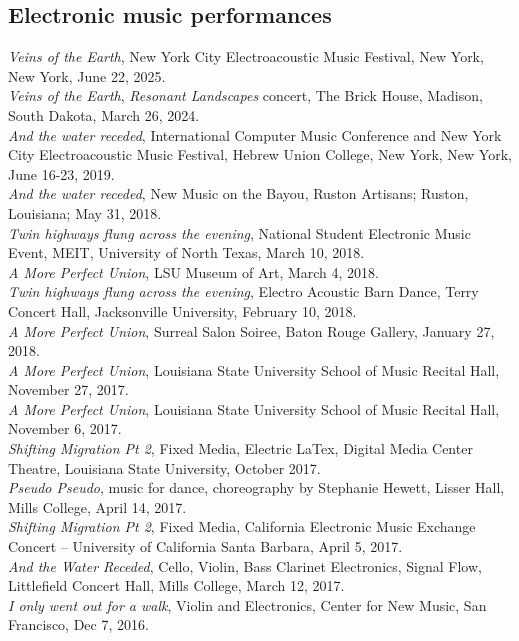 \documentclass[12pt, a4paper]{article}
\newcommand{\years}[1]{\leavevmode\marginnote{\scriptsize #1}\ignorespaces}%
\begin{document}
\subsection*{Electronic music performances}
\years{2025} \textit{Veins of the Earth}, New York City Electroacoustic Music Festival, New York, New York, June 22, 2025. \\
\years{2024} \textit{Veins of the Earth}, \textit{Resonant Landscapes} concert, The Brick House, Madison, South Dakota, March 26, 2024. \\
\years{2019} \textit{And the water receded}, International Computer Music Conference and New York City Electroacoustic Music Festival, Hebrew Union College, New York, New York, June 16-23, 2019. \\
\years{2018} \textit{And the water receded}, New Music on the Bayou, Ruston Artisans; Ruston, Louisiana; May 31, 2018. \\  
\textit{Twin highways flung across the evening}, National Student Electronic Music Event, MEIT, University of North Texas, March 10, 2018. \\
\textit{A More Perfect Union}, LSU Museum of Art, March 4, 2018. \\
\textit{Twin highways flung across the evening}, Electro Acoustic Barn Dance, Terry Concert Hall, Jacksonville University, February 10, 2018. \\
\textit{A More Perfect Union}, Surreal Salon Soiree, Baton Rouge Gallery, January 27, 2018.\\
\years{2017}\textit{A  More Perfect Union}, Louisiana State University School of Music Recital Hall, November 27, 2017. \\
\textit{A More Perfect Union}, Louisiana State University School of Music Recital Hall, November 6, 2017.\\
\textit{Shifting Migration Pt 2}, Fixed Media, Electric LaTex, Digital Media Center Theatre, Louisiana State University, October 2017.\\
\textit{Pseudo Pseudo}, music for dance, choreography by Stephanie Hewett, Lisser Hall, Mills College, April 14, 2017. \\
\textit{Shifting Migration Pt 2}, Fixed Media, California Electronic Music Exchange Concert – University of California Santa Barbara, April 5, 2017.\\
\textit{And the Water Receded}, Cello, Violin, Bass Clarinet Electronics, Signal Flow, Littlefield Concert Hall, Mills College, March 12, 2017.\\
\years{2016} \textit{I only went out for a walk}, Violin and Electronics, Center for New Music, San Francisco, Dec 7, 2016.\\
\end{document}

